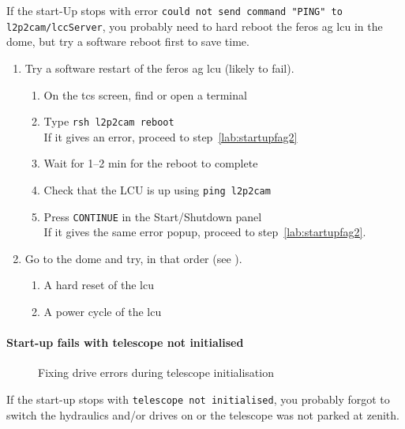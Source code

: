 \documentclass[11pt,fleqn,a4paper]{book}
\begin{document}
If the start-Up stops with error \texttt{could not send command "PING" to l2p2cam/lccServer}, you probably need to hard reboot the  \gls{feros} \gls{ag} \gls{lcu} in the dome, but try a software reboot first to save time.

    \begin{enumerate}
        \item Try a software restart of the \gls{feros} \gls{ag} \gls{lcu} (likely to fail).
        \begin{enumerate}
            \item On the \gls{tcs} screen, find or open a terminal
            \item Type \texttt{rsh \gls{l2p2cam} reboot}\\
                  If it gives an error, proceed to step~\ref{lab:startupfag2}
            \item Wait for 1--2 min for the reboot to complete 
            \item Check that the LCU is up using \texttt{ping \gls{l2p2cam}}
            \item Press \texttt{CONTINUE} in the Start/Shutdown panel\\
                  If it gives the same error popup, proceed to step~\ref{lab:startupfag2}. 
        \end{enumerate}
        \item\label{lab:startupfag2} Go to the dome and try, in that order (see ).
            \begin{enumerate}
            \item A hard reset of the \gls{lcu}
            \item A \gls{power cycle} of the \gls{lcu}
            \end{enumerate}
    \end{enumerate}

\paragraph{Start-up fails with telescope not initialised}
\begin{figure}[t]
\hfill
{}
\caption{Fixing drive errors during telescope initialisation}
\label{fig:drives}
\end{figure}
If the start-up stops with \texttt{telescope not initialised}, you probably forgot to switch the hydraulics and/or drives on or the telescope was not parked at zenith. 
\end{document}
